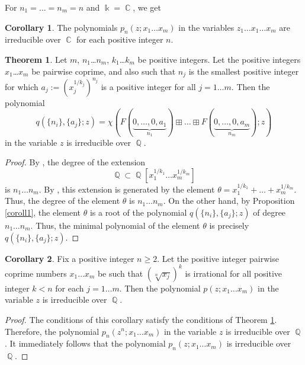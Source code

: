 \documentclass[14pt, dvipsnames]{extarticle}
\theoremstyle{definition}
\newtheorem{theorem}{Theorem}
\newtheorem{coroll}{Corollary}[theorem]
\theoremstyle{definition}
\theoremstyle{remark}
\DeclareMathOperator{\kk}{\Bbbk}
\DeclareMathOperator{\Q}{\mathbb{Q}}
\DeclareMathOperator{\Cc}{\mathbb{C}}
\begin{document}
For $n_1 = … = n_m = n$ and $\kk = \Cc$, we get

\begin{coroll}\label{irred_p_n_over_C}
The polynomials $p_n(z; x_1\dots x_m)$ in the variables $z_1\dots x_1\dots x_m$ are irreducible over $\Cc$ for each positive integer $n$.
\end{coroll}

\begin{theorem}\label{irreducible}
Let $m$, $n_1$\dots $n_m$, $k_1$\dots $k_m$ be positive integers. Let the positive integers $x_1$\dots $x_m$ be pairwise coprime, and also such that $n_j$ is the smallest positive integer for which $a_j := \left(x_j^{1/k_j}\right)^{n_j}$ is a positive integer for all $j = 1\dots m$. Then the polynomial
\begin{equation}\label{sum_of_Frobenius_cells_a}q(\{n_i\}, \{a_j\}; z) =  \chi(F(\underset{n_1}{\underbrace{0,…,0, a_1}})\boxplus…\boxplus F(\underset{n_m}{\underbrace{0,…,0, a_m}}); z)\end{equation}
in the variable $z$ is irreducible over $\Q$.
\end{theorem}

\begin{proof}
By \cite[Theorem]{Ursell}, the degree of the extension $$\Q\subset \Q[x_1^{1/k_1}\dots x_m^{1/k_m}]$$ is $n_1 \dots n_m$. By \cite[Corollary 4.7]{Albu}, this extension is generated by the element $\theta = x_1^{1/k_1} + … + x_m^{1/k_m}$. Thus, the degree of the element $\theta$ is $n_1 \dots n_m$. On the other hand, by Proposition \ref{coroll1}, the element $\theta$ is a root of the polynomial $q(\{n_i\}, \{a_j\}; z)$ of degree $n_1 \dots n_m$. Thus, the minimal polynomial of the element $\theta$ is precisely $q(\{n_i\}, \{a_j\}; z)$.
\end{proof}

\begin{coroll}
Fix a positive integer $n \geqslant 2$. Let the positive integer pairwise coprime numbers $x_1\dots x_m$ be such that $(\sqrt[n]{x_j})^k$ is irrational for all positive integer $k < n$ for each $j = 1\dots m$. Then the polynomial $p(z; x_1\dots x_m)$ in the variable $z$ is irreducible over $\Q$.
\end{coroll}

\begin{proof}
The conditions of this corollary satisfy the conditions of Theorem \ref{irreducible}. Therefore, the polynomial $p_n(z^n; x_1\dots x_m)$ in the variable $z$ is irreducible over $\Q$. It immediately follows that the polynomial $p_n(z; x_1\dots x_m)$ is irreducible over $\Q$.
\end{proof}
\end{document}
